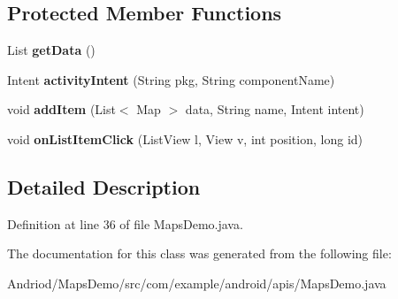 \subsection*{Protected Member Functions}
\begin{DoxyCompactItemize}
\item 
\hypertarget{classcom_1_1example_1_1android_1_1apis_1_1_maps_demo_ae3d31cc60738b9d617b66263d649d979}{List {\bfseries get\-Data} ()}\label{classcom_1_1example_1_1android_1_1apis_1_1_maps_demo_ae3d31cc60738b9d617b66263d649d979}

\item 
\hypertarget{classcom_1_1example_1_1android_1_1apis_1_1_maps_demo_a82e10f82f4f86004fab135af13df87da}{Intent {\bfseries activity\-Intent} (String pkg, String component\-Name)}\label{classcom_1_1example_1_1android_1_1apis_1_1_maps_demo_a82e10f82f4f86004fab135af13df87da}

\item 
\hypertarget{classcom_1_1example_1_1android_1_1apis_1_1_maps_demo_aec1fb45112c6734dd3d866525c117201}{void {\bfseries add\-Item} (List$<$ Map $>$ data, String name, Intent intent)}\label{classcom_1_1example_1_1android_1_1apis_1_1_maps_demo_aec1fb45112c6734dd3d866525c117201}

\item 
\hypertarget{classcom_1_1example_1_1android_1_1apis_1_1_maps_demo_a4aac7a5362b301019e466032250c646e}{void {\bfseries on\-List\-Item\-Click} (List\-View l, View v, int position, long id)}\label{classcom_1_1example_1_1android_1_1apis_1_1_maps_demo_a4aac7a5362b301019e466032250c646e}

\end{DoxyCompactItemize}


\subsection{Detailed Description}


Definition at line 36 of file Maps\-Demo.\-java.



The documentation for this class was generated from the following file\-:\begin{DoxyCompactItemize}
\item 
Andriod/\-Maps\-Demo/src/com/example/android/apis/Maps\-Demo.\-java\end{DoxyCompactItemize}
